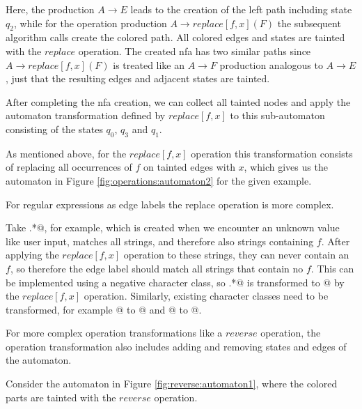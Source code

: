 Here, the production $A \rightarrow E$ leads to the creation of the left path including state $q_2$, while for the operation production $A \rightarrow replace[f,x](F)$ the subsequent algorithm calls create the colored path. All colored edges and states are tainted with the $replace$ operation. The created \ac{nfa} has two similar paths since $A \rightarrow replace[f,x](F)$ is treated like an $A \rightarrow F$ production analogous to $A \rightarrow E$, just that the resulting edges and adjacent states are tainted.

After completing the \ac{nfa} creation, we can collect all tainted nodes and apply the automaton transformation defined by $replace[f,x]$ to this sub-automaton consisting of the states $q_0$, $q_3$ and $q_1$.

As mentioned above, for the $replace[f,x]$ operation this transformation consists of replacing all occurrences of $f$ on tainted edges with $x$, which gives us the automaton in Figure \ref{fig:operations:automaton2} for the given example.

For regular expressions as edge labels the replace operation is more complex.

Take \Verb@.*@, for example, which is created when we encounter an unknown value like user input, matches all strings, and therefore also strings containing $f$. After applying the $replace[f,x]$ operation to these strings, they can never contain an $f$, so therefore the edge label should match all strings that contain no $f$. This can be implemented using a negative character class, so \Verb@.*@ is transformed to \Verb@[^f]@ by the $replace[f,x]$ operation. Similarly, existing character classes need to be transformed, for example \Verb@[abf]@ to \Verb@[abx]@ and \Verb@[^ab]@ to \Verb@[^abf]@.

For more complex operation transformations like a $reverse$ operation, the operation transformation also includes adding and removing states and edges of the automaton.

Consider the automaton in Figure \ref{fig:reverse:automaton1}, where the colored parts are tainted with the $reverse$ operation.

